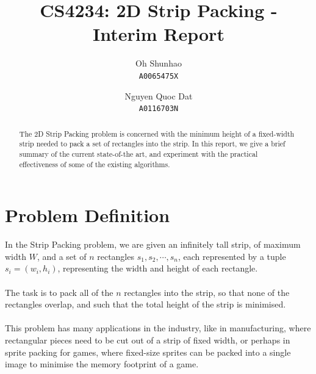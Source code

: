 \documentclass{article}
\begin{document}
\author{
Oh Shunhao\\
  \texttt{A0065475X}
  \and
Nguyen Quoc Dat\\
  \texttt{A0116703N}
}
\title{CS4234: 2D Strip Packing - Interim Report}
\date{}

\maketitle

\begin{abstract}
\begin{center}
The 2D Strip Packing problem is concerned with the minimum height of a fixed-width strip needed to pack a set of rectangles into the strip. In this report, we give a brief summary of the current state-of-the art, and experiment with the practical effectiveness of some of the existing algorithms.
\end{center}
\end{abstract}

\section{Problem Definition}
In the Strip Packing problem, we are given an infinitely tall strip, of maximum width $W$, and a set of $n$ rectangles $s_1,s_2,\cdots,s_n$, each represented by a tuple $s_i = (w_i,h_i)$, representing the width and height of each rectangle.\\
\\
The task is to pack all of the $n$ rectangles into the strip, so that none of the rectangles overlap, and such that the total height of the strip is minimised.\\
\\
This problem has many applications in the industry, like in manufacturing, where rectangular pieces need to be cut out of a strip of fixed width, or perhaps in sprite packing for games, where fixed-size sprites can be packed into a single image to minimise the memory footprint of a game.\\
\end{document}
